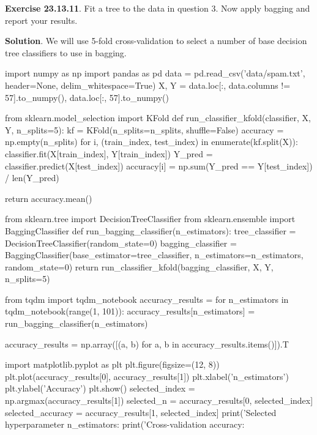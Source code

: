 \textbf{Exercise 23.13.11}. Fit a tree to the data in question 3. Now
apply bagging and report your results.

\textbf{Solution}.
We will use 5-fold cross-validation to select a number of base decision
tree classifiers to use in bagging.

\begin{python}
import numpy as np
import pandas as pd
data = pd.read_csv('data/spam.txt', header=None, delim_whitespace=True)
X, Y = data.loc[:, data.columns != 57].to_numpy(), data.loc[:, 57].to_numpy()
\end{python}

\begin{python}
from sklearn.model_selection import KFold
def run_classifier_{k}fold(classifier, X, Y, n_splits=5):
    kf = KFold(n_splits=n_splits, shuffle=False)
    accuracy = np.empty(n_splits)
    for i, (train_{i}ndex, test_{i}ndex) in enumerate(kf.split(X)):
        classifier.fit(X[train_{i}ndex], Y[train_{i}ndex])
        Y_pred = classifier.predict(X[test_{i}ndex])
        accuracy[i] = np.sum(Y_pred == Y[test_{i}ndex]) / len(Y_pred)
    
    return accuracy.mean()
\end{python}

\begin{python}
from sklearn.tree import DecisionTreeClassifier
from sklearn.ensemble import BaggingClassifier
def run_bagging_classifier(n_estimators):
    tree_classifier = DecisionTreeClassifier(random_state=0)
    bagging_classifier = BaggingClassifier(base_estimator=tree_classifier, 
        n_estimators=n_estimators, random_state=0)
    return run_classifier_{k}fold(bagging_classifier, X, Y, n_splits=5)
\end{python}

\begin{python}
from tqdm import tqdm_notebook
accuracy_results = {}
for n_estimators in tqdm_notebook(range(1, 101)):
    accuracy_results[n_estimators] = run_bagging_classifier(n_estimators)
    
accuracy_results = np.array([(a, b) for a, b in accuracy_results.items()]).T
\end{python}

\begin{python}
import matplotlib.pyplot as plt
plt.figure(figsize=(12, 8))
plt.plot(accuracy_results[0], accuracy_results[1])
plt.xlabel('n_estimators')
plt.ylabel('Accuracy')
plt.show()
selected_{i}ndex = np.argmax(accuracy_results[1])
selected_n = accuracy_results[0, selected_{i}ndex]
selected_accuracy = accuracy_results[1, selected_{i}ndex]
print('Selected hyperparameter n_estimators: %
print('Cross-validation accuracy: %
\end{python}

